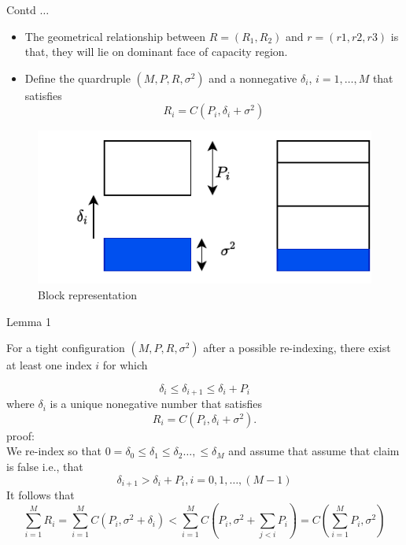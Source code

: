 \documentclass[10pt]{beamer}
\begin{document}
\begin{frame}[t]{Contd $\dots$}
	\begin{itemize}
		\item The geometrical relationship between $R = (R_1, R_2)$ and $r = (r1,r2,r3)$ is that, they will lie on dominant face of capacity region.
		\item Define the quardruple $\left( M, P, R, \sigma^2\right)$ and a nonnegative $\delta_i$, $i = 1, \dots , M$ that satisfies
		\begin{equation}
			R_i = C(P_i, \delta_i+\sigma^2)
		\end{equation}
	\end{itemize}
\begin{figure}[htb!]
\centering
\includegraphics[height=.3\textheight]{pic_6.pdf}
\caption{Block representation}
\label{fig6}
\end{figure}
\end{frame}


\begin{frame}[t]{Lemma 1}
	
\begin{block}{}
	For a tight configuration $\left(M, P, R, \sigma^2 \right)$ after a possible re-indexing, there exist at least one index $i$ for which
	\end{block}
\begin{equation}
	\delta_i \leq \delta_{i+1} \leq \delta_i  + P_i 
\end{equation}
where $\delta_i$ is a unique nonegative number that satisfies
\begin{equation}
	R_i = C(P_i, \delta_i + \sigma^2).
\end{equation}
proof:\\
	We re-index so that $ 0=\delta_0 \leq \delta_1 \leq \delta_2 \dots , \leq \delta_M $ and assume that assume that claim is false i.e., that
	\begin{equation}
		\delta_{i+1} > \delta_i + P_i, i = 0,1, \dots, (M-1)
	\end{equation}
	It follows that	
	\begin{equation}
		\sum_{i =1}^{M} R_i = \sum_{i=1}^{M} C(P_i, \sigma^2+\delta_i)<  \sum_{i=1}^{M} C \left( P_i, \sigma^2+ \sum_{j<i} P_i \right) = C \left(  \sum_{i=1}^{M} P_i, \sigma^2 \right)
	\end{equation}
	\end{frame}
\end{document}
